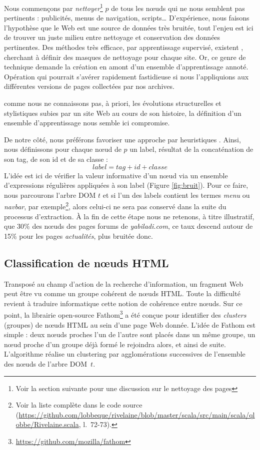 \documentclass[symmetric,justified,marginals=raggedouter]{tufte-book}
\begin{document}
\noindent Nous commençons par \textit{nettoyer}\footnote{\RaggedOuter Voir la section suivante pour une discussion sur le nettoyage des pages} $p$ de tous les nœuds qui ne nous semblent pas pertinents : publicités, menus de navigation, scripts\ldots{} D'expérience, nous faisons l'hypothèse que le Web est une source de données très bruitée, tout l'enjeu est ici de trouver un juste milieu entre nettoyage et conservation des données pertinentes. Des méthodes très efficace, par apprentissage supervisé, existent \citep{kohlschutter_boilerplate_2010}, cherchant à définir des masques de nettoyage pour chaque site.  Or, ce genre de technique demande la création en amont d'un ensemble d'apprentissage annoté. Opération qui pourrait s'avérer rapidement fastidieuse si nous l'appliquions aux différentes versions de pages collectées par nos archives.


comme nous ne connaissons pas, à priori, les évolutions structurelles et stylistiques subies par un site Web au cours de son histoire, la définition d'un ensemble d'apprentissage nous semble ici compromise. 

De notre côté, nous préférons favoriser une approche par heuristiques \citep{jatowt_detecting_2007}. Ainsi, nous définissons pour chaque nœud de $p$ un label, résultat de la concaténation de son tag, de son id et de sa classe : 
\[
label = tag + id + classe
\]
\noindent L'idée est ici de vérifier la valeur informative d'un nœud via un ensemble d'expressions régulières appliquées à son label (Figure \ref{fig:bruit}). Pour ce faire, nous parcourons l'arbre DOM $t$ et si l'un des labels contient les termes \textit{menu} ou \textit{navbar}, par exemple\footnote{\RaggedOuter Voir la liste complète dans le code source (\url{https://github.com/lobbeque/rivelaine/blob/master/scala/src/main/scala/qlobbe/Rivelaine.scala}, l.~72-73).}, alors celui-ci ne sera pas conservé dans la suite du processus d'extraction. À la fin de cette étape nous ne retenons, à titre illustratif, que 30\% des nœuds des pages forums de \textit{yabiladi.com}, ce taux descend autour de 15\% pour les pages \textit{actualités}, plus bruitée donc. 

\subsection{Classification de nœuds HTML}

\noindent Transposé au champ d'action de la recherche d'information, un fragment Web peut être vu comme un groupe cohérent de nœuds HTML. Toute la difficulté revient à traduire informatique cette notion de cohérence entre nœuds. Sur ce point, la librairie open-source Fathom\footnote{\RaggedOuter \url{https://github.com/mozilla/fathom}} a été conçue pour identifier des \textit{clusters} (groupes) de nœuds HTML au sein d'une page Web donnée. L'idée de Fathom est simple : deux nœuds proches l'un de l'autre sont placés dans un même groupe, un nœud proche d'un groupe déjà formé le rejoindra alors, et ainsi de suite. L'algorithme réalise un clustering par agglomérations successives de l'ensemble des nœuds de l'arbre DOM~$t$. 
\end{document}
